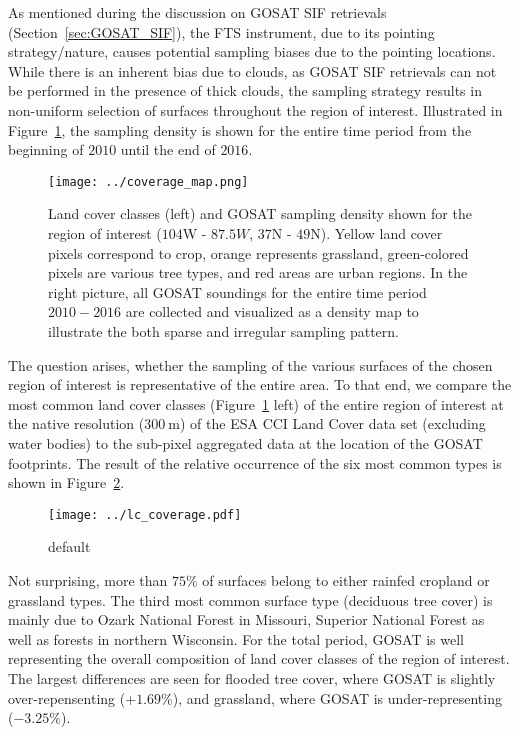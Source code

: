 \documentclass[preprint, a4paper, 10pt, times]{elsarticle}
\begin{document}
As mentioned during the discussion on GOSAT SIF retrievals (Section~\ref{sec:GOSAT_SIF}), the FTS instrument, due to its pointing strategy/nature, causes potential sampling biases due to the pointing locations. While there is an inherent bias due to clouds, as GOSAT SIF retrievals can not be performed in the presence of thick clouds, the sampling strategy results in non-uniform selection of surfaces throughout the region of interest. Illustrated in Figure~\ref{fig:sampling}, the sampling density is shown for the entire time period from the beginning of $2010$ until the end of $2016$. 

\begin{figure}[htbp]
\centering
\texttt{[image: ../coverage\_map.png]}
\caption{Land cover classes (left) and GOSAT sampling density shown for the region of interest ($104$W - $87.5W$, $37$N - $49$N). Yellow land cover pixels correspond to crop, orange represents grassland, green-colored pixels are various tree types, and red areas are urban regions. In the right picture, all GOSAT soundings for the entire time period $2010-2016$ are collected and visualized as a density map to illustrate the both sparse and irregular sampling pattern.}
\label{fig:sampling}
\end{figure}

The question arises, whether the sampling of the various surfaces of the chosen region of interest is representative of the entire area. To that end, we compare the most common land cover classes (Figure~\ref{fig:sampling} left) of the entire region of interest at the native resolution ($300\:\mathrm{m}$) of the ESA CCI Land Cover data set (excluding water bodies) to the sub-pixel aggregated data at the location of the GOSAT footprints. The result of the relative occurrence of the six most common types is shown in Figure~\ref{fig:lc_coverage}. 

\begin{figure}[htbp]
\centering
\texttt{[image: ../lc\_coverage.pdf]}
\caption{default}
\label{fig:lc_coverage}
\end{figure}

Not surprising, more than $75\%$ of surfaces belong to either rainfed cropland or grassland types. The third most common surface type (deciduous tree cover) is mainly due to Ozark National Forest in Missouri, Superior National Forest as well as forests in northern Wisconsin. For the total period, GOSAT is well representing the overall composition of land cover classes of the region of interest. The largest differences are seen for flooded tree cover, where GOSAT is slightly over-repensenting ($+1.69\%$), and grassland, where GOSAT is under-representing ($-3.25\%$).
\end{document}
